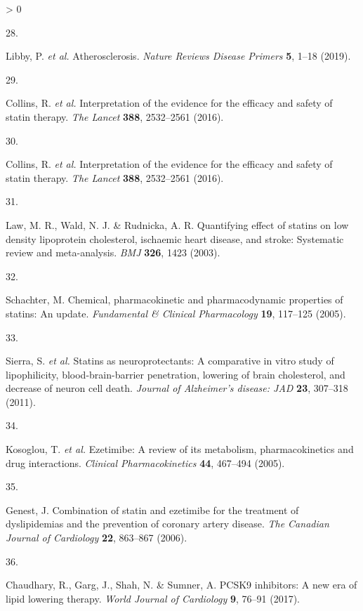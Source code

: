 \documentclass[a4paper, twoside]{templates/ociamthesis}
\newlength{\cslhangindent}
\newlength{\csllabelwidth}
\newenvironment{CSLReferences}[3] %
 {%
  \setlength{\parindent}{0pt}
  \ifodd #1 \everypar{\setlength{\hangindent}{\cslhangindent}}\ignorespaces\fi
  \ifnum #2 > 0
  \setlength{\parskip}{#2\baselineskip}
  \fi
 }%
 {}
\newcommand{\CSLLeftMargin}[1]{\parbox[t]{\maxof{\widthof{#1}}{\csllabelwidth}}{#1}}
\newcommand{\CSLRightInline}[1]{\parbox[t]{\linewidth - \csllabelwidth}{#1}}
\begin{document}
\begin{CSLReferences}{0}{0}
\leavevmode\hypertarget{ref-libby2019}{}%
\CSLLeftMargin{28. }
\CSLRightInline{Libby, P. \emph{et al.} Atherosclerosis. \emph{Nature Reviews Disease Primers} \textbf{5}, 1--18 (2019).}

\leavevmode\hypertarget{ref-collins2016}{}%
\CSLLeftMargin{29. }
\CSLRightInline{Collins, R. \emph{et al.} Interpretation of the evidence for the efficacy and safety of statin therapy. \emph{The Lancet} \textbf{388}, 2532--2561 (2016).}

\leavevmode\hypertarget{ref-collins2016a}{}%
\CSLLeftMargin{30. }
\CSLRightInline{Collins, R. \emph{et al.} Interpretation of the evidence for the efficacy and safety of statin therapy. \emph{The Lancet} \textbf{388}, 2532--2561 (2016).}

\leavevmode\hypertarget{ref-law2003}{}%
\CSLLeftMargin{31. }
\CSLRightInline{Law, M. R., Wald, N. J. \& Rudnicka, A. R. Quantifying effect of statins on low density lipoprotein cholesterol, ischaemic heart disease, and stroke: Systematic review and meta-analysis. \emph{BMJ} \textbf{326}, 1423 (2003).}

\leavevmode\hypertarget{ref-schachter2005}{}%
\CSLLeftMargin{32. }
\CSLRightInline{Schachter, M. Chemical, pharmacokinetic and pharmacodynamic properties of statins: An update. \emph{Fundamental \& Clinical Pharmacology} \textbf{19}, 117--125 (2005).}

\leavevmode\hypertarget{ref-sierra2011}{}%
\CSLLeftMargin{33. }
\CSLRightInline{Sierra, S. \emph{et al.} Statins as neuroprotectants: A comparative in vitro study of lipophilicity, blood-brain-barrier penetration, lowering of brain cholesterol, and decrease of neuron cell death. \emph{Journal of Alzheimer's disease: JAD} \textbf{23}, 307--318 (2011).}

\leavevmode\hypertarget{ref-kosoglou2005}{}%
\CSLLeftMargin{34. }
\CSLRightInline{Kosoglou, T. \emph{et al.} Ezetimibe: A review of its metabolism, pharmacokinetics and drug interactions. \emph{Clinical Pharmacokinetics} \textbf{44}, 467--494 (2005).}

\leavevmode\hypertarget{ref-genest2006}{}%
\CSLLeftMargin{35. }
\CSLRightInline{Genest, J. Combination of statin and ezetimibe for the treatment of dyslipidemias and the prevention of coronary artery disease. \emph{The Canadian Journal of Cardiology} \textbf{22}, 863--867 (2006).}

\leavevmode\hypertarget{ref-chaudhary2017}{}%
\CSLLeftMargin{36. }
\CSLRightInline{Chaudhary, R., Garg, J., Shah, N. \& Sumner, A. {PCSK9} inhibitors: {A} new era of lipid lowering therapy. \emph{World Journal of Cardiology} \textbf{9}, 76--91 (2017).}


\end{CSLReferences}
\end{document}
